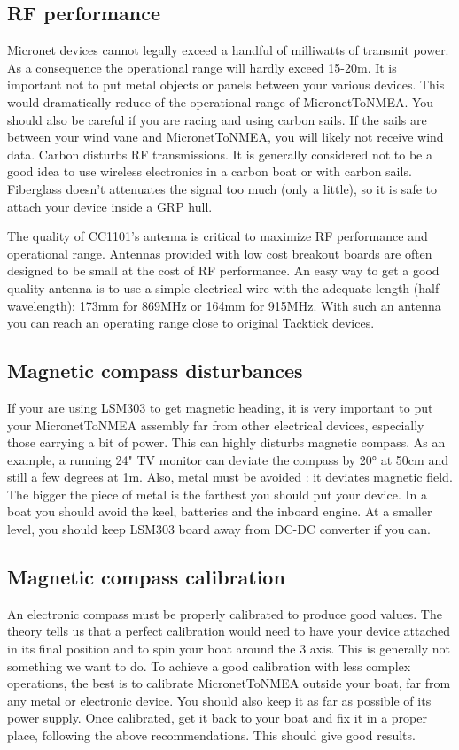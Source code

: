 \documentclass{report}
\begin{document}
\subsection{RF performance}
Micronet devices cannot legally exceed a handful of milliwatts of transmit power. As a consequence the operational range will hardly exceed 15-20m. It is important not to put metal objects or panels between your various devices. This would dramatically reduce of the operational range of MicronetToNMEA.
You should also be careful if you are racing and using carbon sails. If the sails are between your wind vane and MicronetToNMEA, you will likely not receive wind data. Carbon disturbs RF transmissions.
It is generally considered not to be a good idea to use wireless electronics in a carbon boat or with carbon sails. Fiberglass doesn't attenuates the signal too much (only a little), so it is safe to attach your device inside a GRP hull.

The quality of CC1101's antenna is critical to maximize RF performance and operational range. Antennas provided with low cost breakout boards are often designed to be small at the cost of RF performance. An easy way to get a good quality antenna is to use a simple electrical wire with the adequate length (half wavelength): 173mm for 869MHz or 164mm for 915MHz. With such an antenna you can reach an operating range close to original Tacktick devices.

\subsection{Magnetic compass disturbances}
\label{compass-recommendations}
If your are using LSM303 to get magnetic heading, it is very important to put your MicronetToNMEA assembly far from other electrical devices, especially those carrying a bit of power. This can highly disturbs magnetic compass. As an example, a running 24" TV monitor can deviate the compass by 20° at 50cm and still a few degrees at 1m.
Also, metal must be avoided : it deviates magnetic field. The bigger the piece of metal is the farthest you should put your device. In a boat you should avoid the keel, batteries and the inboard engine. At a smaller level, you should keep LSM303 board away from DC-DC converter if you can.

\subsection{Magnetic compass calibration}
An electronic compass must be properly calibrated to produce good values. The theory tells us that a perfect calibration would need to have your device attached in its final position and to spin your boat around the 3 axis. This is generally not something we want to do. To achieve a good calibration with less complex operations, the best is to calibrate MicronetToNMEA outside your boat, far from any metal or electronic device. You should also keep it as far as possible of its power supply. Once calibrated, get it back to your boat and fix it in a proper place, following the above recommendations. This should give good results.
\end{document}
